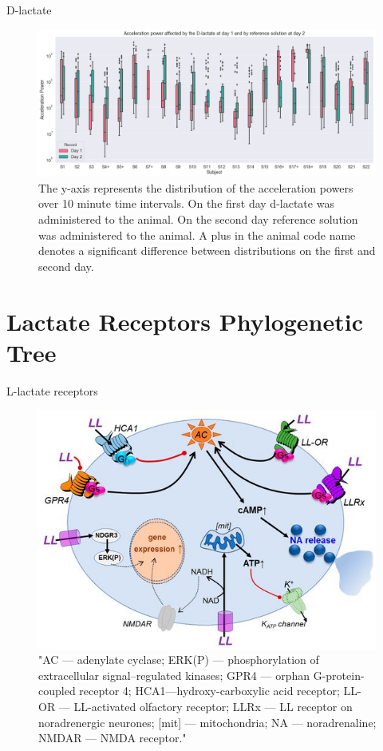 \documentclass[10pt]{beamer}
\begin{document}
\begin{frame}[fragile]{D-lactate}
\begin{figure}[H]
\centering
\includegraphics[width=0.9\linewidth]{exp4_2.png}
\caption{The y-axis represents the distribution of the acceleration powers over 10 minute time intervals. On the first day d-lactate was administered to the animal. On the second day reference solution was administered to the animal. A plus in the animal code name denotes a significant difference between distributions on the first and second day.}\label{fig:lactate_receptors}
\end{figure}
\end{frame}

\section{Lactate Receptors Phylogenetic Tree}

\begin{frame}[fragile]{L-lactate receptors}
\begin{figure}[H]
\centering
\includegraphics[width=0.7\linewidth]{lactate_receptors.jpg}
\caption{"AC — adenylate cyclase; ERK(P) — phosphorylation of extracellular signal–regulated kinases; GPR4 — orphan G-protein-coupled receptor 4; HCA1—hydroxy-carboxylic acid receptor; LL-OR — LL-activated olfactory receptor; LLRx — LL receptor on noradrenergic neurones; [mit] — mitochondria; NA — noradrenaline; NMDAR — NMDA receptor." \citep{Mosienko2018}}\label{fig:lactate_receptors}
\end{figure}
\end{frame}
\end{document}

